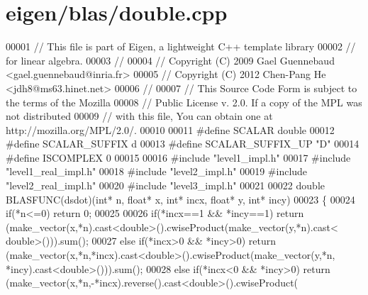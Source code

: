 \hypertarget{eigen_2blas_2double_8cpp_source}{}\section{eigen/blas/double.cpp}
\label{eigen_2blas_2double_8cpp_source}

\begin{DoxyCode}
00001 \textcolor{comment}{// This file is part of Eigen, a lightweight C++ template library}
00002 \textcolor{comment}{// for linear algebra.}
00003 \textcolor{comment}{//}
00004 \textcolor{comment}{// Copyright (C) 2009 Gael Guennebaud <gael.guennebaud@inria.fr>}
00005 \textcolor{comment}{// Copyright (C) 2012 Chen-Pang He <jdh8@ms63.hinet.net>}
00006 \textcolor{comment}{//}
00007 \textcolor{comment}{// This Source Code Form is subject to the terms of the Mozilla}
00008 \textcolor{comment}{// Public License v. 2.0. If a copy of the MPL was not distributed}
00009 \textcolor{comment}{// with this file, You can obtain one at http://mozilla.org/MPL/2.0/.}
00010 
00011 \textcolor{preprocessor}{#define SCALAR        double}
00012 \textcolor{preprocessor}{#define SCALAR\_SUFFIX d}
00013 \textcolor{preprocessor}{#define SCALAR\_SUFFIX\_UP "D"}
00014 \textcolor{preprocessor}{#define ISCOMPLEX     0}
00015 
00016 \textcolor{preprocessor}{#include "level1\_impl.h"}
00017 \textcolor{preprocessor}{#include "level1\_real\_impl.h"}
00018 \textcolor{preprocessor}{#include "level2\_impl.h"}
00019 \textcolor{preprocessor}{#include "level2\_real\_impl.h"}
00020 \textcolor{preprocessor}{#include "level3\_impl.h"}
00021 
00022 \textcolor{keywordtype}{double} BLASFUNC(dsdot)(\textcolor{keywordtype}{int}* n, \textcolor{keywordtype}{float}* x, \textcolor{keywordtype}{int}* incx, \textcolor{keywordtype}{float}* y, \textcolor{keywordtype}{int}* incy)
00023 \{
00024   \textcolor{keywordflow}{if}(*n<=0) \textcolor{keywordflow}{return} 0;
00025 
00026   \textcolor{keywordflow}{if}(*incx==1 && *incy==1)    \textcolor{keywordflow}{return} (make\_vector(x,*n).cast<\textcolor{keywordtype}{double}>().cwiseProduct(make\_vector(y,*n).cast<\textcolor{keywordtype}{
      double}>())).sum();
00027   \textcolor{keywordflow}{else} \textcolor{keywordflow}{if}(*incx>0 && *incy>0) \textcolor{keywordflow}{return} (make\_vector(x,*n,*incx).cast<\textcolor{keywordtype}{double}>().cwiseProduct(make\_vector(y,*n,
      *incy).cast<\textcolor{keywordtype}{double}>())).sum();
00028   \textcolor{keywordflow}{else} \textcolor{keywordflow}{if}(*incx<0 && *incy>0) \textcolor{keywordflow}{return} (make\_vector(x,*n,-*incx).reverse().cast<\textcolor{keywordtype}{double}>().cwiseProduct(

\end{DoxyCode}
